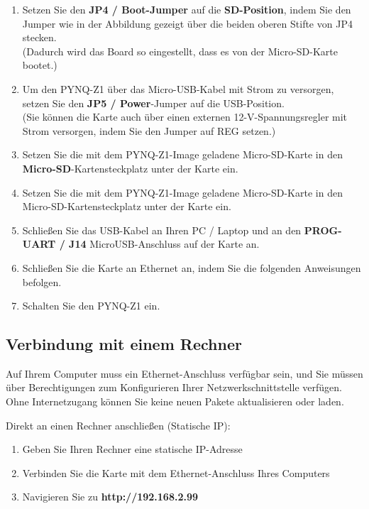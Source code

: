 \documentclass[a4paper]{report}
\begin{document}
	\begin{enumerate} 
		\item Setzen Sie den \textbf{JP4 / Boot-Jumper} auf die \textbf{SD-Position}, indem Sie den Jumper wie in der Abbildung gezeigt über die beiden oberen Stifte von JP4 stecken.\\
		 (Dadurch wird das Board so eingestellt, dass es von der Micro-SD-Karte bootet.)

		\item Um den PYNQ-Z1 über das Micro-USB-Kabel mit Strom zu versorgen, setzen Sie den \textbf{ JP5 / Power}-Jumper auf die USB-Position.\\
(Sie können die Karte auch über einen externen 12-V-Spannungsregler mit Strom versorgen, indem Sie den Jumper auf REG setzen.)

		\item Setzen Sie die mit dem PYNQ-Z1-Image geladene Micro-SD-Karte in den \textbf{Micro-SD}-Kartensteckplatz unter der Karte ein.

		\item Setzen Sie die mit dem PYNQ-Z1-Image geladene Micro-SD-Karte in den Micro-SD-Kartensteckplatz unter der Karte ein.

		\item Schließen Sie das USB-Kabel an Ihren PC / Laptop und an den \textbf{PROG-UART / J14} MicroUSB-Anschluss auf der Karte an.

		\item Schließen Sie die Karte an Ethernet an, indem Sie die folgenden Anweisungen befolgen.

		\item Schalten Sie den PYNQ-Z1 ein.

	\end{enumerate}



\subsection{Verbindung mit einem Rechner}
Auf Ihrem Computer muss ein Ethernet-Anschluss verfügbar sein, und Sie müssen über Berechtigungen zum Konfigurieren Ihrer Netzwerkschnittstelle verfügen. Ohne Internetzugang können Sie keine neuen Pakete aktualisieren oder laden.

	Direkt an einen Rechner anschließen (Statische IP):
		\begin{enumerate} 
		\item Geben Sie Ihren Rechner eine statische IP-Adresse
		\item Verbinden Sie die Karte mit dem Ethernet-Anschluss Ihres Computers
		\item Navigieren Sie zu \textbf{http://192.168.2.99}
		\end{enumerate}
 
\end{document}
